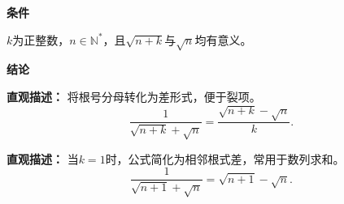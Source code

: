 \begin{statementbox}
	\textbf{\textcolor{CStatement}{条件}}
	\begin{description}[style=nextline, leftmargin=2.8em, labelsep=0.5em, itemsep=0.35em]
		\item[\textbf{\textcolor{CStatement}{条件1（变量范围）：}}] $k$为正整数，$n\in\mathbb{N}^*$，且$\sqrt{n+k}$与$\sqrt{n}$均有意义。
	\end{description}

	\textbf{\textcolor{CStatement}{结论}}
	\begin{description}[style=nextline, leftmargin=2.8em, labelsep=0.5em, itemsep=0.45em]
		\item[\textbf{\textcolor{CStatement}{结论一（分母有理化）：}}]
			\textbf{\textcolor{CStatement}{直观描述：}}
			将根号分母转化为差形式，便于裂项。
			\[
				\frac{1}{\sqrt{n+k}+\sqrt{n}} = \frac{\sqrt{n+k}-\sqrt{n}}{k}.
			\]

		\item[\textbf{\textcolor{CStatement}{常见变形（相邻根式差）：}}]
			\textbf{\textcolor{CStatement}{直观描述：}}
			当$k=1$时，公式简化为相邻根式差，常用于数列求和。
			\[
				\frac{1}{\sqrt{n+1}+\sqrt{n}} = \sqrt{n+1}-\sqrt{n}.
			\]
	\end{description}
\end{statementbox}
